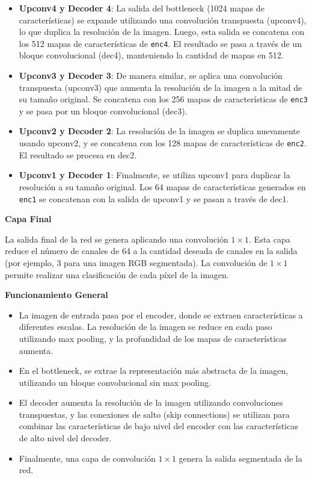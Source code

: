 \begin{enumerate}
\begin{itemize}
\begin{itemize}
    \item \textbf{Upconv4 y Decoder 4}: La salida del bottleneck (1024 mapas de características) se expande utilizando una convolución transpuesta (upconv4), lo que duplica la resolución de la imagen. Luego, esta salida se concatena con los 512 mapas de características de \texttt{enc4}. El resultado se pasa a través de un bloque convolucional (dec4), manteniendo la cantidad de mapas en 512.
    \item \textbf{Upconv3 y Decoder 3}: De manera similar, se aplica una convolución transpuesta (upconv3) que aumenta la resolución de la imagen a la mitad de su tamaño original. Se concatena con los 256 mapas de características de \texttt{enc3} y se pasa por un bloque convolucional (dec3).
    \item \textbf{Upconv2 y Decoder 2}: La resolución de la imagen se duplica nuevamente usando upconv2, y se concatena con los 128 mapas de características de \texttt{enc2}. El resultado se procesa en dec2.
    \item \textbf{Upconv1 y Decoder 1}: Finalmente, se utiliza upconv1 para duplicar la resolución a su tamaño original. Los 64 mapas de características generados en \texttt{enc1} se concatenan con la salida de upconv1 y se pasan a través de dec1.
\end{itemize}

\textbf{Capa Final}

La salida final de la red se genera aplicando una convolución $1 \times 1$. Esta capa reduce el número de canales de 64 a la cantidad deseada de canales en la salida (por ejemplo, 3 para una imagen RGB segmentada). La convolución de $1 \times 1$ permite realizar una clasificación de cada píxel de la imagen.

\textbf{Funcionamiento General}

\begin{itemize}
    \item La imagen de entrada pasa por el encoder, donde se extraen características a diferentes escalas. La resolución de la imagen se reduce en cada paso utilizando max pooling, y la profundidad de los mapas de características aumenta.
    \item En el bottleneck, se extrae la representación más abstracta de la imagen, utilizando un bloque convolucional sin max pooling.
    \item El decoder aumenta la resolución de la imagen utilizando convoluciones transpuestas, y las conexiones de salto (skip connections) se utilizan para combinar las características de bajo nivel del encoder con las características de alto nivel del decoder.
    \item Finalmente, una capa de convolución $1 \times 1$ genera la salida segmentada de la red.
\end{itemize}


\end{itemize}
\end{enumerate}
